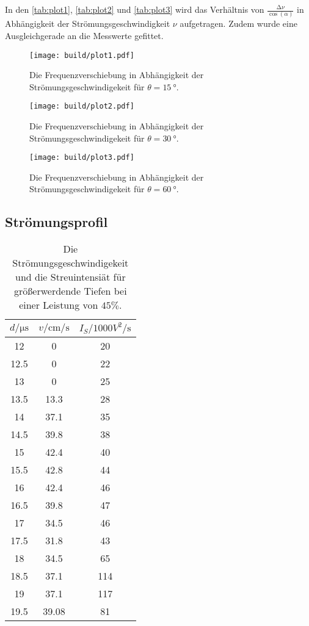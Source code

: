 In den \autoref{tab:plot1}, \autoref{tab:plot2} und \autoref{tab:plot3} wird das Verhältnis von $\frac{\increment \nu}{\cos (\alpha)}$ in Abhängigkeit der Strömungsgeschwindigkeit
$\nu$ aufgetragen. Zudem wurde eine Ausgleichgerade an die Messwerte gefittet.

\begin{figure}[H]
	\texttt{[image: build/plot1.pdf]}
	\caption{Die Frequenzverschiebung in Abhängigkeit der Strömungsgeschwindigekeit für $\theta = \qty{15}{°}$.}
	\label{fig:plot1}
\end{figure}

\begin{figure}[H]
	\texttt{[image: build/plot2.pdf]}
	\caption{Die Frequenzverschiebung in Abhängigkeit der Strömungsgeschwindigekeit für $\theta = \qty{30}{°}$.}
	\label{fig:plot2}
\end{figure}

\begin{figure}[H]
	\texttt{[image: build/plot3.pdf]}
	\caption{Die Frequenzverschiebung in Abhängigkeit der Strömungsgeschwindigekeit für $\theta = \qty{60}{°}$.}
	\label{fig:plot3}
\end{figure}

\subsection{Strömungsprofil}
\label{sec:Strömungsprofil}

\begin{table}[H]
    \centering
    \caption{Die Strömungsgeschwindigekeit und die Streuintensiät für größerwerdende Tiefen bei einer Leistung von $45 \%$.}
\begin{tabular}{c c c}
    \toprule
    $d / \si{\micro\second}$ & $ v / \si{\centi \meter \per \second}$ & $I_S / 1000 \si{ V^2 \per \second} $\\
    \midrule
      12 &     0 &  20 \\
    12.5 &     0 &  22 \\
      13 &     0 &  25 \\
    13.5 &  13.3 &  28 \\
      14 &  37.1 &  35 \\
    14.5 &  39.8 &  38 \\
      15 &  42.4 &  40 \\
    15.5 &  42.8 &  44 \\
      16 &  42.4 &  46 \\
    16.5 &  39.8 &  47 \\
      17 &  34.5 &  46 \\
    17.5 &  31.8 &  43 \\
      18 &  34.5 &  65 \\
    18.5 &  37.1 & 114 \\
      19 &  37.1 & 117 \\
    19.5 & 39.08 &  81 \\
    \bottomrule
    \end{tabular}
\end{table}

